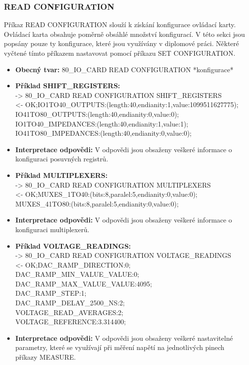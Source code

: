 \subsubsection{READ CONFIGURATION}
Příkaz READ CONFIGURATION slouží k získání konfigurace ovládací karty. Ovládací karta obsahuje poměrně obsáhlé množství konfigurací.
V této sekci jsou popsány pouze ty konfigurace, které jsou využívány v diplomové práci. Některé vyčtené tímto příkazem nastavovat
pomocí příkazu SET CONFIGURATION.
\begin{itemize}[leftmargin=*]
    \item \textbf{Obecný tvar:} 80\_IO\_CARD READ CONFIGURATION *konfigurace*
    \item \textbf{Příklad SHIFT\_REGISTERS:}\\
    -> 80\_IO\_CARD READ CONFIGURATION SHIFT\_REGISTERS\\
    <- OK;IO1TO40\_OUTPUTS:(length:40,endianity:1,value:1099511627775);\\
    IO41TO80\_OUTPUTS:(length:40,endianity:0,value:0);\\
    IO1TO40\_IMPEDANCES:(length:40,endianity:1,value:1);\\
    IO41TO80\_IMPEDANCES:(length:40,endianity:0,value:0);
    \item \textbf{Interpretace odpovědi:} V odpovědi jsou obsaženy veškeré informace o konfiguraci posuvných registrů.
    \item \textbf{Příklad MULTIPLEXERS:}\\
    -> 80\_IO\_CARD READ CONFIGURATION MULTIPLEXERS\\
    <- OK;MUXES\_1TO40:(bits:8,paralel:5,endianity:0,value:0);\\
    MUXES\_41TO80:(bits:8,paralel:5,endianity:0,value:0);
    \item \textbf{Interpretace odpovědi:} V odpovědi jsou obsaženy veškeré informace o konfiguraci multiplexerů.
    \item \textbf{Příklad VOLTAGE\_READINGS:}\\
    -> 80\_IO\_CARD READ CONFIGURATION VOLTAGE\_READINGS\\
    <- OK;DAC\_RAMP\_DIRECTION:0;\\
    DAC\_RAMP\_MIN\_VALUE\_VALUE:0;\\
    DAC\_RAMP\_MAX\_VALUE\_VALUE:4095;\\
    DAC\_RAMP\_STEP:1;\\
    DAC\_RAMP\_DELAY\_2500\_NS:2;\\
    VOLTAGE\_READ\_AVERAGES:2;\\
    VOLTAGE\_REFERENCE:3.314400;
    \item \textbf{Interpretace odpovědi:} V odpovědi jsou obsaženy veškeré nastavitelné parametry, které se využívají při měření napětí na jednotlivých pinech příkazy MEASURE.
\end{itemize}





